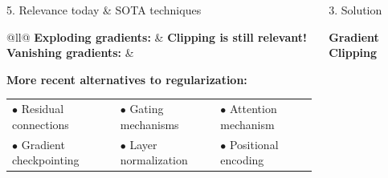 \documentclass[final]{beamer}
\begin{document}
\begin{frame}[t]
\begin{columns}[t,totalwidth=\textwidth]
\begin{column}{0.3\textwidth}
\begin{block}{5. Relevance today \& SOTA techniques}
            \begin{tabular}{@{}ll@{}}
                \textbf{Exploding gradients:} & \textbf{Clipping is still relevant!} \\
                \textbf{Vanishing gradients:} & 
                    \begin{minipage}[t]{0.8\textwidth} 
                        \textbf{More recent alternatives to regularization:}\\[0.3em]
                        \begin{tabular}{@{}lll@{}}
                        $\bullet$ Residual connections     & $\bullet$ Gating mechanisms       & $\bullet$ Attention mechanism \\
                        $\bullet$ Gradient checkpointing   & $\bullet$ Layer normalization     & $\bullet$ Positional encoding \\
                        \end{tabular}
                    \end{minipage} \\
                \end{tabular}
                
                \end{block}
    
\end{column}



    \begin{column}{0.35\textwidth}
        \begin{block}{3. Solution }

        \textbf{Gradient Clipping}
        
    

\end{block}
\end{column}
\end{columns}
\end{frame}
\end{document}
